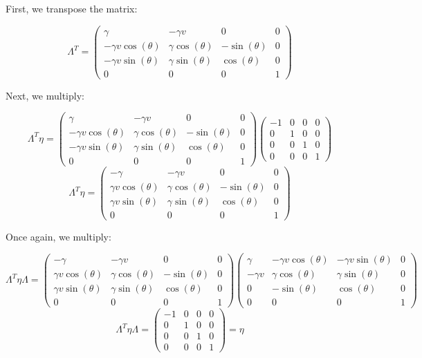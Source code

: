 \begin{enumerate}
    First, we transpose the matrix:

    $$\Lambda^T=\left( \begin{array}{cccc} \gamma & -\gamma v & 0 & 0\\ -\gamma v\cos(\theta) & \gamma \cos(\theta) & -\sin(\theta) & 0\\ -\gamma v\sin(\theta) & \gamma\sin(\theta) & \cos(\theta) & 0\\ 0 & 0 & 0 & 1\end{array} \right)$$

    Next, we multiply:

    $$\Lambda^T\eta=\left( \begin{array}{cccc} \gamma & -\gamma v & 0 & 0\\ -\gamma v\cos(\theta) & \gamma \cos(\theta) & -\sin(\theta) & 0\\ -\gamma v\sin(\theta) & \gamma\sin(\theta) & \cos(\theta) & 0\\ 0 & 0 & 0 & 1\end{array} \right)\left( \begin{matrix} -1 & 0 & 0 & 0\\ 0 & 1 & 0 & 0\\ 0 & 0 & 1 & 0\\ 0 & 0 & 0 & 1 \end{matrix} \right)$$
    $$\Lambda^T\eta=\left( \begin{matrix}-\gamma & -\gamma v & 0 & 0\\ \gamma v\cos(\theta) & \gamma\cos(\theta) & -\sin(\theta) & 0\\ \gamma v\sin(\theta) & \gamma\sin(\theta) & \cos(\theta) & 0\\ 0 & 0 & 0 & 1 \end{matrix} \right)$$

    Once again, we multiply:

    $$\Lambda^T\eta\Lambda=\left( \begin{matrix}-\gamma & -\gamma v & 0 & 0\\ \gamma v\cos(\theta) & \gamma\cos(\theta) & -\sin(\theta) & 0\\ \gamma v\sin(\theta) & \gamma\sin(\theta) & \cos(\theta) & 0\\ 0 & 0 & 0 & 1 \end{matrix} \right)\left( \begin{array}{cccc} \gamma & -\gamma v\cos(\theta) & -\gamma v\sin(\theta) & 0\\ -\gamma v& \gamma \cos(\theta) & \gamma\sin(\theta) & 0\\ 0 & -\sin(\theta) & \cos(\theta) & 0\\ 0 & 0 & 0 & 1\end{array} \right)$$
    $$\boxed{\Lambda^T\eta\Lambda=\left( \begin{matrix} -1 & 0 & 0 & 0\\ 0 & 1 & 0 & 0\\ 0 & 0 & 1 & 0\\ 0 & 0 & 0 & 1 \end{matrix}\right)=\eta}$$


\end{enumerate}
